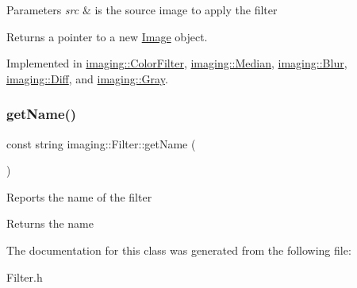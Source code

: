 \begin{DoxyParams}{Parameters}
{\em src} & is the source image to apply the filter\\
\hline
\end{DoxyParams}
\begin{DoxyReturn}{Returns}
a pointer to a new \hyperlink{classimaging_1_1_image}{Image} object. 
\end{DoxyReturn}


Implemented in \hyperlink{classimaging_1_1_color_filter_a38b3f549e53f0d25b56a388350213782}{imaging\+::\+Color\+Filter}, \hyperlink{classimaging_1_1_median_a9b6e9ac628f71aaad3e7b668832e5a10}{imaging\+::\+Median}, \hyperlink{classimaging_1_1_blur_a3b4898453abe24e7f0be3fbd2cba829c}{imaging\+::\+Blur}, \hyperlink{classimaging_1_1_diff_af0562801611f5d33d4319bdab15d29a4}{imaging\+::\+Diff}, and \hyperlink{classimaging_1_1_gray_a12fb554726775cf110acfa73c468caee}{imaging\+::\+Gray}.

\mbox{\label{classimaging_1_1_filter_a42614ff975ea370d98446ef34fb76538}} 
\subsubsection{\texorpdfstring{get\+Name()}{getName()}}
{\footnotesize\ttfamily const string imaging\+::\+Filter\+::get\+Name (\begin{DoxyParamCaption}{ }\end{DoxyParamCaption})\hspace{0.3cm}{\ttfamily [inline]}}

Reports the name of the filter

\begin{DoxyReturn}{Returns}
the name 
\end{DoxyReturn}


The documentation for this class was generated from the following file\+:\begin{DoxyCompactItemize}
\item 
Filter.\+h\end{DoxyCompactItemize}
